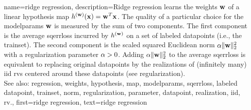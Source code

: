 {name={ridge regression}, 
	description={Ridge 
		\gls{regression} learns the \gls{weights} ${\bf w}$ of a linear \gls{hypothesis} \gls{map} $h^{({\bf w})}({\bf x})= {\bf w}^{T} {\bf x}$. 
		The quality of a particular choice for the \gls{modelparams} ${\bf w}$ is measured by the sum 
		of two components. The first component is the average \gls{sqerrloss} incurred by $h^{({\bf w})}$ on a set of 
		\glspl{labeled datapoint} (i.e., the \gls{trainset}). The second component is the scaled squared 
		Euclidean \gls{norm} $\alpha \| {\bf w} \|^{2}_{2}$ with a \gls{regularization} \gls{parameter} 
		$\alpha > 0$. Adding $\alpha \| {\bf w} \|^{2}_{2}$ to 
	    	the average \gls{sqerrloss} is equivalent to replacing original \glspl{datapoint} by the \glspl{realization} 
	    	of (infinitely many) \gls{iid} \glspl{rv} centered around these \glspl{datapoint} (see \gls{regularization}).
	    		\\
		See also: \gls{regression}, \gls{weights}, \gls{hypothesis}, \gls{map}, \gls{modelparams}, \gls{sqerrloss}, \gls{labeled datapoint}, \gls{trainset}, \gls{norm}, \gls{regularization}, \gls{parameter}, \gls{datapoint}, \gls{realization}, \gls{iid}, \gls{rv}.},
	first={ridge regression},
	text={ridge regression}
}


